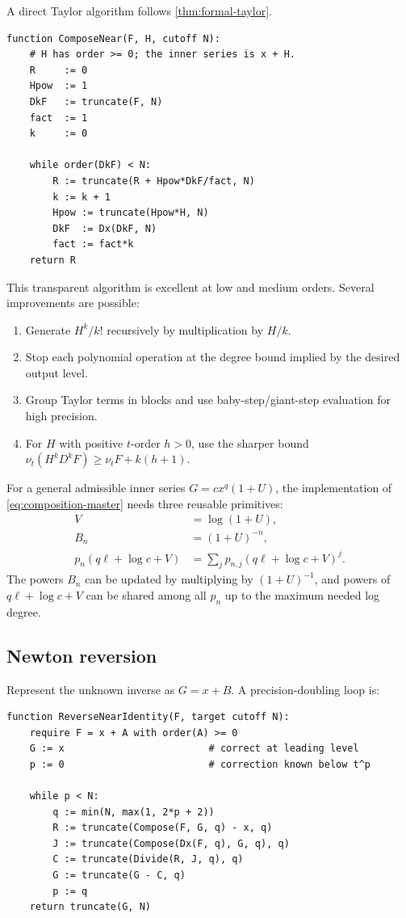 \documentclass[11pt,oneside]{article}
\numberwithin{equation}{section}
\theoremstyle{definition}
\newcommand{\ordx}{\nu_t}
\begin{document}
A direct Taylor algorithm follows \cref{thm:formal-taylor}.

\begin{lstlisting}[style=pseudocode,caption={Near-identity composition \(F\circ(x+H)\).}]
function ComposeNear(F, H, cutoff N):
    # H has order >= 0; the inner series is x + H.
    R     := 0
    Hpow  := 1
    DkF   := truncate(F, N)
    fact  := 1
    k     := 0

    while order(DkF) < N:
        R := truncate(R + Hpow*DkF/fact, N)
        k := k + 1
        Hpow := truncate(Hpow*H, N)
        DkF  := Dx(DkF, N)
        fact := fact*k
    return R
\end{lstlisting}

This transparent algorithm is excellent at low and medium orders.  Several
improvements are possible:
\begin{enumerate}
\item Generate \(H^k/k!\) recursively by multiplication by \(H/k\).
\item Stop each polynomial operation at the degree bound implied by the desired
  output level.
\item Group Taylor terms in blocks and use baby-step/giant-step evaluation for
  high precision.
\item For \(H\) with positive \(t\)-order \(h>0\), use the sharper bound
  \(\ordx(H^kD^kF)\ge\ordx F+k(h+1)\).
\end{enumerate}

For a general admissible inner series \(G=cx^q(1+U)\), the implementation of
\eqref{eq:composition-master} needs three reusable primitives:
\begin{align*}
  V&=\log(1+U),\\
  B_n&=(1+U)^{-n},\\
  p_n(q\ell+\log c+V)&=
    \sum_j p_{n,j}(q\ell+\log c+V)^j.
\end{align*}
The powers \(B_n\) can be updated by multiplying by \((1+U)^{-1}\), and powers
of \(q\ell+\log c+V\) can be shared among all \(p_n\) up to the maximum needed
log degree.

\subsection{Newton reversion}

Represent the unknown inverse as \(G=x+B\).  A precision-doubling loop is:

\begin{lstlisting}[style=pseudocode,caption={Newton series reversal in the PL ring.}]
function ReverseNearIdentity(F, target cutoff N):
    require F = x + A with order(A) >= 0
    G := x                         # correct at leading level
    p := 0                         # correction known below t^p

    while p < N:
        q := min(N, max(1, 2*p + 2))
        R := truncate(Compose(F, G, q) - x, q)
        J := truncate(Compose(Dx(F, q), G, q), q)
        C := truncate(Divide(R, J, q), q)
        G := truncate(G - C, q)
        p := q
    return truncate(G, N)
\end{lstlisting}
\end{document}
